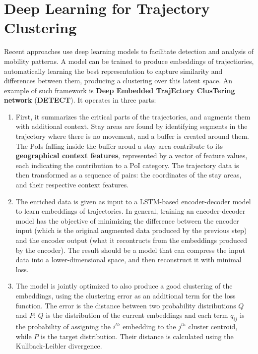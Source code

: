 \section{Deep Learning for Trajectory Clustering}
Recent approaches use deep learning models to facilitate detection and analysis of mobility patterns. A model can be trained to produce embeddings of trajectiories, automatically learning the best representation to capture similarity and differences between them, producing a clustering over this latent space. An example of such framework is \textbf{Deep Embedded TrajEctory ClusTering network} (\textbf{DETECT}). It operates in three parts:
\begin{enumerate}
    \item First, it summarizes the critical parts of the trajectories, and augments them with additional context. Stay areas are found by identifying segments in the trajectory where there is no movement, and a buffer is created around them. The PoIs falling inside the buffer aroud a stay area contribute to its \textbf{geographical context features}, represented by a vector of feature values, each indicating the contribution to a PoI category. The trajectory data is then transformed as a sequence of pairs: the coordinates of the stay areas, and their respective context features.
    \item The enriched data is given as input to a LSTM-based encoder-decoder model to learn embeddings of trajectories. In general, training an encoder-decoder model has the objective of minimizing the difference between the encoder input (which is the original augmented data produced by the previous step) and the encoder output (what it recontructs from the embeddings produced by the encoder). The result should be a model that can compress the input data into a lower-dimensional space, and then reconstruct it with minimal loss.
    \item The model is jointly optimized to also produce a good clustering of the embeddings, using the clustering error as an additional term for the loss function. The error is the distance between two probability distributions $Q$ and $P$: $Q$ is the distribution of the current embeddings and each term $q_{ij}$ is the probability of assigning the $i^{th}$ embedding to the $j^{th}$ cluster centroid, while $P$ is the target distribution. Their distance is calculated using the Kullback-Leibler divergence.
\end{enumerate}
